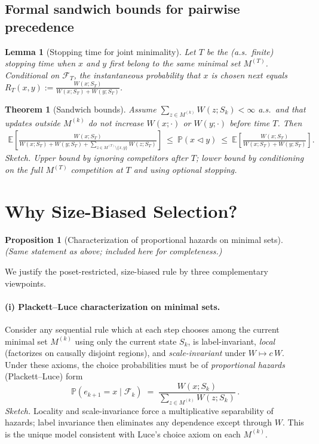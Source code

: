 \documentclass[12pt,a4paper]{article}
\newtheorem{proposition}{Proposition}
\newtheorem{theorem}{Theorem}
\newtheorem{lemma}{Lemma}
\newcommand{\E}{\mathbb{E}}
\begin{document}
\subsection{Formal sandwich bounds for pairwise precedence}

\begin{lemma}[Stopping time for joint minimality]
Let $T$ be the (a.s.\ finite) stopping time when $x$ and $y$ first belong to the same minimal set $M^{(T)}$. Conditional on $\mathcal F_T$, the instantaneous probability that $x$ is chosen next equals $R_T(x,y):=\frac{W(x;S_T)}{W(x;S_T)+W(y;S_T)}$.
\end{lemma}

\begin{theorem}[Sandwich bounds]\label{thm:sandwich}
Assume $\sum_{z\in M^{(k)}} W(z;S_k)<\infty$ a.s.\ and that updates outside $M^{(k)}$ do not increase $W(x;\cdot)$ or $W(y;\cdot)$ before time $T$. Then
\begin{align*}
\E\!\left[\frac{W(x;S_T)}{W(x;S_T)+W(y;S_T)+\sum_{z\in M^{(T)}\setminus\{x,y\}} W(z;S_T)}\right]
\ \le\ \mathbb P(x\triangleleft y)\ \le\
\E\!\left[\frac{W(x;S_T)}{W(x;S_T)+W(y;S_T)}\right].
\end{align*}
\textit{Sketch.} Upper bound by ignoring competitors after $T$; lower bound by conditioning on the full $M^{(T)}$ competition at $T$ and using optional stopping.
\end{theorem}

\section{Why Size-Biased Selection?}
\begin{proposition}[Characterization of proportional hazards on minimal sets]\label{prop:pl_char}
(Same statement as above; included here for completeness.)
\end{proposition}
\label{sec:why_size_biased}
We justify the poset-restricted, size-biased rule by three complementary viewpoints.
\paragraph{(i) Plackett--Luce characterization on minimal sets.}
Consider any sequential rule which at each step chooses among the current minimal set $M^{(k)}$ using only the current state $S_k$, is label-invariant, \emph{local} (factorizes on causally disjoint regions), and \emph{scale-invariant} under $W\mapsto c\,W$. Under these axioms, the choice probabilities must be of \emph{proportional hazards} (Plackett--Luce) form
\[
\mathbb{P}(e_{k+1}=x\mid \mathcal{F}_k) \;=\; \frac{W(x;S_k)}{\sum_{z\in M^{(k)}} W(z;S_k)}\,.
\]
\emph{Sketch.} Locality and scale-invariance force a multiplicative separability of hazards; label invariance then eliminates any dependence except through $W$. This is the unique model consistent with Luce's choice axiom on each $M^{(k)}$.
\end{document}
